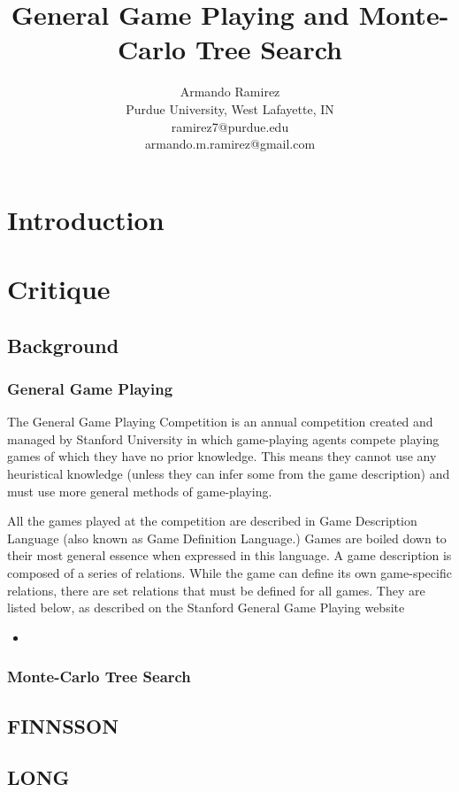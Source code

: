 \documentclass[letterpaper]{article}
\title{General Game Playing and Monte-Carlo Tree Search}
\author{Armando Ramirez \\ Purdue University, West Lafayette, IN \\ ramirez7@purdue.edu \\ armando.m.ramirez@gmail.com}
\begin{document}
\maketitle

\section{Introduction}

\section{Critique}

\subsection{Background}

\subsubsection{General Game Playing}
The General Game Playing Competition is an annual competition created and managed by Stanford University in which game-playing agents compete playing games of which they have no prior knowledge.\cite{StanfordGGP} This means they cannot use any heuristical knowledge (unless they can infer some from the game description) and must use more general methods of game-playing.

All the games played at the competition are described in Game Description Language (also known as Game Definition Language.) Games are boiled down to their most general essence when expressed in this language. A game description is composed of a series of relations. While the game can define its own game-specific relations, there are set relations that must be defined for all games. They are listed below, as described on the Stanford General Game Playing website \cite{StanfordGGP}
\begin{itemize}
\item 
\end{itemize}
\subsubsection{Monte-Carlo Tree Search}

\subsection{FINNSSON}

\subsection{LONG}
\end{document}
